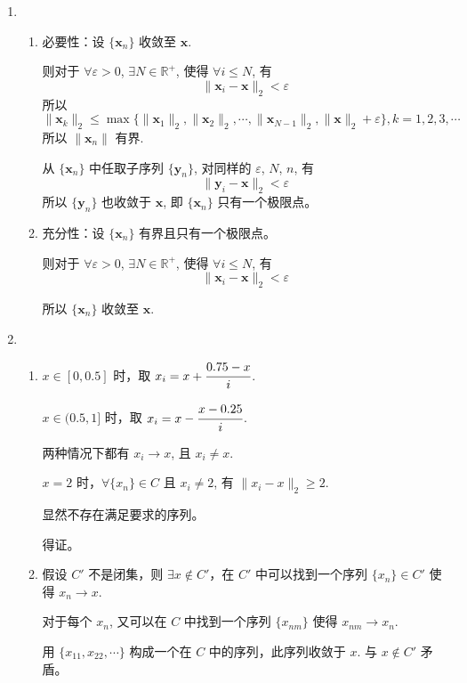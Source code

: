 \documentclass[11pt,letter,notitlepage]{article}
\theoremstyle{definition}
\begin{document}
\begin{solution}
	\begin{enumerate}
		\item \begin{enumerate}
			      \item 必要性：设 $\{\mathbf{x}_n\}$ 收敛至 $\mathbf{x}$.

			            则对于 $\forall \varepsilon >0$, $\exists N \in \mathbb{R}^+$, 使得 $\forall i \leq N$, 有
			            $$\|\mathbf{x}_i-\mathbf{x}\|_2 < \varepsilon$$
			            所以
			            $$\|\mathbf{x}_k\|_2\leq\max \{\|\mathbf{x}_1\|_2,\|\mathbf{x}_2\|_2,\cdots,\|\mathbf{x}_{N-1}\|_2,\|\mathbf{x}\|_2+\varepsilon\}, k=1,2,3,\cdots$$
			            所以 $\|\mathbf{x}_n\|$ 有界.

			            从 $\{\mathbf{x}_n\}$ 中任取子序列 $\{\mathbf{y}_n\}$, 对同样的 $\varepsilon$, $N$, $n$, 有
			            $$\|\mathbf{y}_i-\mathbf{x}\|_2 < \varepsilon$$
			            所以 $\{\mathbf{y}_n\}$ 也收敛于 $\mathbf{x}$, 即 $\{\mathbf{x}_n\}$ 只有一个极限点。
			      \item 充分性：设 $\{\mathbf{x}_n\}$ 有界且只有一个极限点。

			            则对于 $\forall \varepsilon >0$, $\exists N \in \mathbb{R}^+$, 使得 $\forall i \leq N$, 有
			            $$\|\mathbf{x}_i-\mathbf{x}\|_2 < \varepsilon$$

			            所以 $\{\mathbf{x}_n\}$ 收敛至 $\mathbf{x}$.
		      \end{enumerate}
		\item \begin{enumerate}
			      \item
			            $x\in[0,0.5]$ 时，取 $x_i=x+\cfrac{0.75-x}{i}$.

			            $x\in(0.5,1]$ 时，取 $x_i=x-\cfrac{x-0.25}{i}$.

			            两种情况下都有 $x_i\to x$, 且 $x_i\neq x$.

			            $x=2$ 时，$\forall \{x_n\}\in C$ 且 $x_i\neq 2$, 有 $\|x_i-x\|_2\geq 2$.

			            显然不存在满足要求的序列。

			            得证。
			      \item 假设 $C'$ 不是闭集，则 $\exists x \notin C'$，在 $C'$ 中可以找到一个序列 $\{x_n\}\in C'$ 使得 $x_n\to x$.
						
				  对于每个 $x_n$, 又可以在 $C$ 中找到一个序列 $\{x_{nm}\}$ 使得 $x_{nm}\to x_n$.

				  用 $\{x_{11},x_{22},\cdots\}$ 构成一个在 $C$ 中的序列，此序列收敛于 $x$. 与 $x\notin C'$ 矛盾。


\end{enumerate}
\end{enumerate}
\end{solution}
\end{document}
